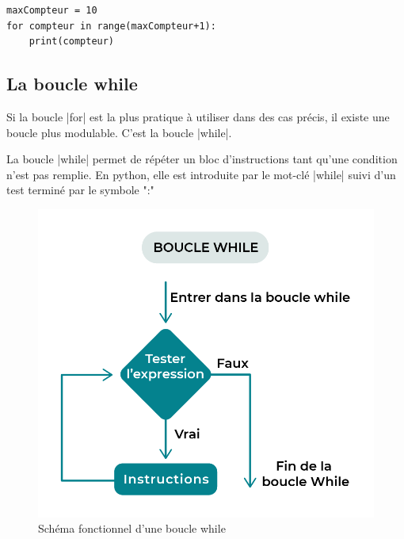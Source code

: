 \documentclass[11pt, a4paper]{book}
\begin{document}
\begin{lstlisting}
maxCompteur = 10
for compteur in range(maxCompteur+1):
    print(compteur)
\end{lstlisting}


\subsection{La boucle \textsf{while}}
Si la boucle |for| est la plus pratique à utiliser dans des cas précis, il existe une boucle plus modulable. C'est la boucle |while|.

\begin{defi} La boucle |while| permet de répéter un bloc d'instructions tant qu'une condition n'est pas remplie. En python, elle est introduite par le mot-clé |while| suivi d'un test terminé par le symbole ":" 
\end{defi}

\begin{figure}[h]\begin{center}
\includegraphics[scale=.3]{images/while-loop}
\caption{Schéma fonctionnel d'une boucle while}
\end{center}\end{figure}
\end{document}
